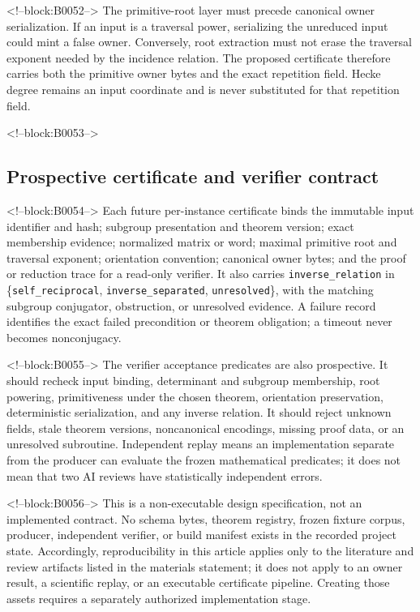 \documentclass[11pt]{article}
\begin{document}
<!--block:B0052-->
The primitive-root layer must precede canonical owner serialization.
If an input is a traversal power, serializing the unreduced input could
mint a false owner. Conversely, root extraction must not erase the
traversal exponent needed by the incidence relation. The proposed
certificate therefore carries both the primitive owner bytes and the
exact repetition field. Hecke degree remains an input coordinate and is
never substituted for that repetition field.

<!--block:B0053-->
\hypertarget{42-prospective-certificate-and-verifier-contract}{%
\subsection{Prospective certificate and verifier
contract}\label{42-prospective-certificate-and-verifier-contract}}

<!--block:B0054-->
Each future per-instance certificate binds the immutable input identifier and
hash; subgroup presentation and theorem version; exact membership evidence;
normalized matrix or word; maximal primitive root and traversal exponent;
orientation convention; canonical owner bytes; and the proof or reduction trace
for a read-only verifier.  It also carries
\texttt{inverse\_relation} in
\{\texttt{self\_reciprocal}, \texttt{inverse\_separated},
\texttt{unresolved}\}, with the matching subgroup conjugator, obstruction, or
unresolved evidence.  A failure record identifies the exact failed precondition
or theorem obligation; a timeout never becomes nonconjugacy.

<!--block:B0055-->
The verifier acceptance predicates are also prospective. It should
recheck input binding, determinant and subgroup membership, root
powering, primitiveness under the chosen theorem, orientation
preservation, deterministic serialization, and any inverse relation. It
should reject unknown fields, stale theorem versions, noncanonical
encodings, missing proof data, or an unresolved subroutine. Independent
replay means an implementation separate from the producer can evaluate
the frozen mathematical predicates; it does not mean that two AI reviews
have statistically independent errors.

<!--block:B0056-->
This is a non-executable design specification, not an implemented contract.
No schema bytes, theorem registry, frozen fixture corpus, producer, independent
verifier, or build manifest exists in the recorded project state. Accordingly,
reproducibility in this article applies only to the literature and review
artifacts listed in the materials statement; it does not apply to an owner
result, a scientific replay, or an executable certificate pipeline. Creating
those assets requires a separately authorized implementation stage.
\end{document}

